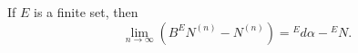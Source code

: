 If $E$ is a finite set, then
$$\lim_{n \to \infty} (B^E N^{(n)} - N^{(n)}) = {}^E d\alpha - {}^E N.$$
